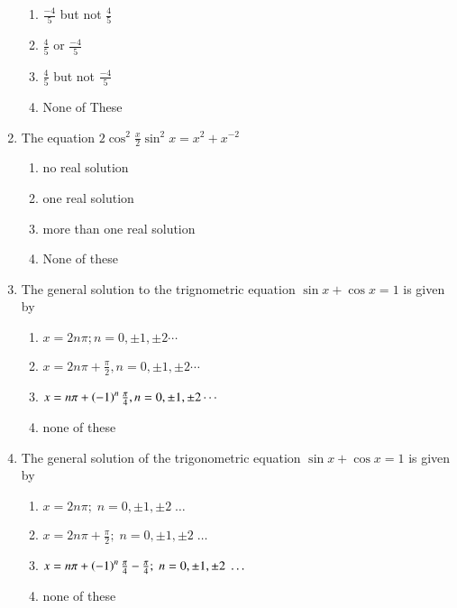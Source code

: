 \begin{enumerate}[label=\thesubsection.\arabic*,ref=\thesubsection.\theenumi]
  
		\begin{multicols}{4}
\begin{enumerate}
				\item $\frac{-4}{5}$ but not $\frac{4}{5}$ 
				\item $\frac{4}{5}$ or $\frac{-4}{5}$ 
				\item $\frac{4}{5}$ but not $\frac{-4}{5}$ 
				\item None of These 
		\end{enumerate}
\end{multicols}
%
	\item The equation $2\cos^{2}\frac{x}{2}\sin^{2}x = x^{2} +x^{-2}$  
		\hfill{}
%      
		\begin{multicols}{2}
\begin{enumerate}
			\item no real solution
	  		\item one real solution
			\item more than one real solution 
			\item None of these
		\end{enumerate}
\end{multicols}
	\item The general solution to the trignometric equation $ \sin x + \cos x = 1$ is given by
		\hfill{}
		\begin{multicols}{2}
\begin{enumerate}
			\item $x=2n\pi;n=0,\pm1,\pm2 \cdots$
			\item  $x = 2n\pi + \frac{\pi}{2}, n = 0, \pm 1, \pm 2 \cdots $
			\item $x=n\pi+\left(-1\right)^{n}\frac{\pi}{4},n = 0,\pm 1,\pm 2 \cdots $ 
			\item none of these
		\end{enumerate}
\end{multicols}
%
    \item The general solution of the trigonometric equation $\sin {x} + \cos{x} = 1$ is given by

        \hfill{}
        \begin{multicols}{2}
\begin{enumerate}
            \item $x = 2n\pi;\;n = 0,\pm1,\pm2\;\dots$
            \item $x = 2n\pi+\frac{\pi}{2};\;n = 0,\pm1,\pm2\;\dots$
            \item $x = n\pi+\left(-1\right)^n\frac{\pi}{4}-\frac{\pi}{4};\;n = 0,\pm1,\pm2\;\dots$
            \item none of these
        \end{enumerate}
\end{multicols}


\end{enumerate}
